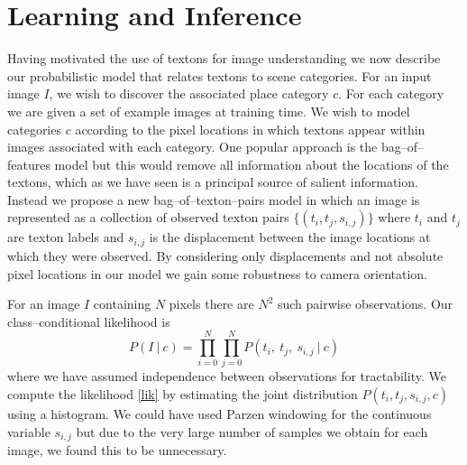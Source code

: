 \section{Learning and Inference}
\label{sec:approach}
Having motivated the use of textons for image understanding we now
describe our probabilistic model that relates textons to scene
categories. For an input image $I$, we wish to discover the associated
place category $c$. For each category we are given a set of example
images at training time. We wish to model categories $c$ according
to the pixel locations in which textons appear within images
associated with each category. One popular approach is the
bag--of--features model \cite{Jebara03} but this would remove all
information about the locations of the textons, which as we have seen
is a principal source of salient information. Instead we propose a new
bag--of--texton--pairs model in which an image is represented as a
collection of observed texton pairs $\{(t_i, t_j, s_{i,j})\}$ where
$t_i$ and $t_j$ are texton labels and $s_{i,j}$ is the displacement
between the image locations at which they were observed. By
considering only displacements and not absolute pixel locations in our
model we gain some robustness to camera orientation.

For an image $I$ containing $N$ pixels there are $N^2$ such
pairwise observations. Our class--conditional likelihood is
\begin{equation}
P(I ~|~ c) = \prod_{i=0}^N \prod_{j=0}^N
P(t_i, ~ t_j, ~ s_{i,j} ~|~ c) \label{lik}
\end{equation}
where we have assumed independence between observations for
tractability. We compute the likelihood \eqref{lik} by estimating the
joint distribution $P(t_i,t_j,s_{i,j},c)$ using a histogram. We could
have used Parzen windowing \cite{Parzen62} for the continuous variable
$s_{i,j}$ but due to the very large number of samples we obtain for
each image, we found this to be unnecessary.


